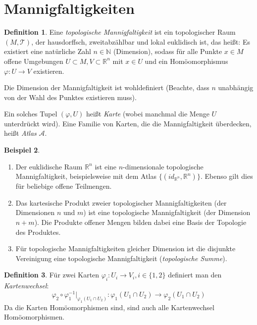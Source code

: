 \documentclass[a4paper]{scrreprt}
\numberwithin{equation}{chapter}
\newcommand{\R}{\mathbb{R}}
\theoremstyle{definition}
\newtheorem{defn}{Definition}[section]
\newtheorem{bsp}[defn]{Beispiel}
\begin{document}
	\section{Mannigfaltigkeiten}
		\begin{defn}
			Eine \emph{topologische Mannigfaltigkeit} ist ein topologischer Raum $(M,\mathcal{T})$, der hausdorffsch, zweitabzählbar und lokal euklidisch ist, das heißt:
			Es existiert eine natürliche Zahl $n\in \mathbb{N}$ (Dimension), sodass für alle Punkte $x\in M$ offene Umgebungen $U\subset M, V\subset \R^n$ mit $x\in U $ und ein Homöomorphismus $ \varphi\colon U\rightarrow V$ existieren.

			Die Dimension der Mannigfaltigkeit ist wohldefiniert (Beachte, dass $n$ unabhängig von der Wahl des Punktes existieren muss).

			Ein solches Tupel $(\varphi,U)$ heißt \emph{Karte} (wobei manchmal die Menge $U$ unterdrückt wird). Eine Familie von Karten, die die Mannigfaltigkeit überdecken, heißt \emph{Atlas} $\mathcal{A}$.
		\end{defn}
		\begin{bsp}\hfill 
			\begin{enumerate}
				\item Der euklidische Raum $\R^n$ ist eine $n$-dimensionale topologische Mannigfaltigkeit, beispielsweise mit dem Atlas $\lbrace (id_{\R^n},\R^n)\rbrace$. Ebenso gilt dies für beliebige offene Teilmengen.
				\item Das kartesische Produkt zweier topologischer Mannigfaltigkeiten (der Dimensionen $n$ und $m$) ist eine topologische Mannigfaltigkeit (der Dimension $n + m$). Die Produkte offener Mengen bilden dabei eine Basis der Topologie des Produktes.
				\item Für topologische Mannigfaltigkeiten gleicher Dimension ist die disjunkte Vereinigung eine topologische Mannigfaltigkeit (\emph{topologische Summe}).
			\end{enumerate}
		\end{bsp}
		\begin{defn}
			Für zwei Karten $\varphi_i\colon U_i\rightarrow V_i, i\in\lbrace 1,2 \rbrace$ definiert man den \emph{Kartenwechsel}:
			\begin{equation*}
				\varphi_2\circ\varphi_1^{-1}\vert_{\varphi_1(U_1\cap U_2)}\colon \varphi_1(U_1\cap U_2)\rightarrow \varphi_2(U_1\cap U_2)
			\end{equation*}
			Da die Karten Homöomorphismen sind, sind auch alle Kartenwechsel Homöomorphismen.
		\end{defn} 
\end{document}
